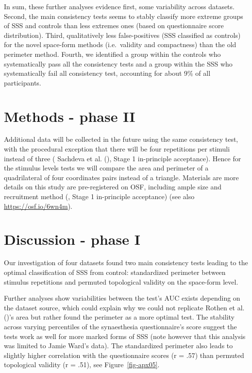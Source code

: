 \documentclass[
  man,
  floatsintext,
  longtable,
  a4paper,
  nolmodern,
  notxfonts,
  notimes,
  colorlinks=true,linkcolor=blue,citecolor=blue,urlcolor=blue]{apa7}
\begin{document}
In sum, these further analyses evidence first, some variability across
datasets. Second, the main consistency tests seems to stably classify
more extreme groups of SSS and controls than less extremes ones (based
on questionnaire score distribution). Third, qualitatively less
false-positives (SSS classified as controls) for the novel space-form
methods (i.e.~validity and compactness) than the old perimeter method.
Fourth, we identified a group within the controls who systematically
pass all the consistency tests and a group within the SSS who
systematically fail all consistency test, accounting for about 9\% of
all participants.

\section{Methods - phase II}\label{sec-phase-ii-methods}

Additional data will be collected in the future using the same
consistency test, with the procedural exception that there will be four
repetitions per stimuli instead of three ( Sachdeva et al.
(), Stage 1 in-principle acceptance).
Hence for the stimulus levels tests we will compare the area and
perimeter of a quadrilateral of four coordinates pairs instead of a
triangle. Materials are more details on this study are pre-registered on
OSF, including ample size and recruitment method
(, Stage 1
in-principle acceptance) (see also \url{https://osf.io/6wn4m}).

\section{Discussion - phase I}\label{discussion---phase-i}

Our investigation of four datasets found two main consistency tests
leading to the optimal classification of SSS from control: standardized
perimeter between stimulus repetitions and permuted topological validity
on the space-form level.

Further analyses show variabilities between the test's AUC exists
depending on the dataset source, which could explain why we could not
replicate Rothen et al. ()'s area but
rather found the perimeter as a more optimal test. The stability across
varying percentiles of the synaesthesia questionnaire's score suggest
the tests work as well for more marked forms of SSS (note however that
this analysis was limited to Jamie Ward's data). The standardized
perimeter also leads to slightly higher correlation with the
questionnaire scores (r = .57) than permuted topological validity (r =
.51), see Figure~\ref{fig-apx05}.
\end{document}
